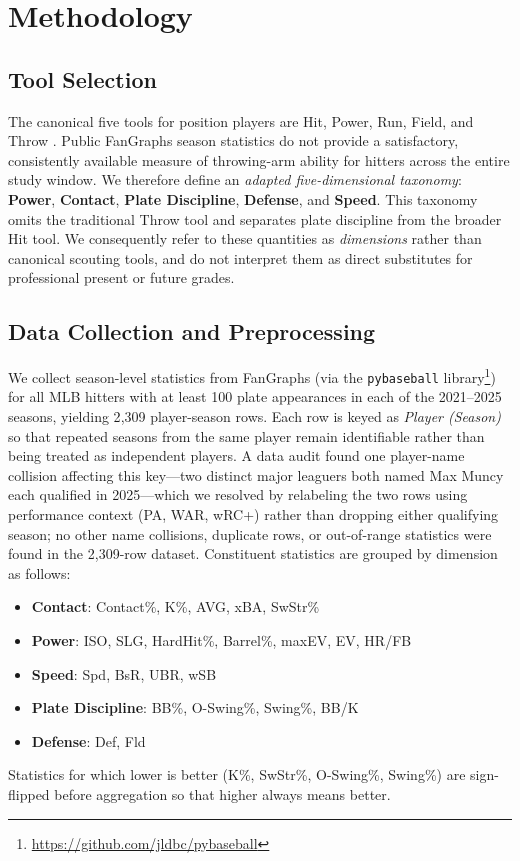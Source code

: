 \documentclass[10pt,twocolumn,letterpaper]{article}
\begin{document}
\section{Methodology}
\label{sec:method}

\subsection{Tool Selection}
The canonical five tools for position players are Hit, Power, Run, Field, and Throw \cite{mcdaniel2014}. Public FanGraphs season statistics do not provide a satisfactory, consistently available measure of throwing-arm ability for hitters across the entire study window. We therefore define an \emph{adapted five-dimensional taxonomy}: \textbf{Power}, \textbf{Contact}, \textbf{Plate Discipline}, \textbf{Defense}, and \textbf{Speed}. This taxonomy omits the traditional Throw tool and separates plate discipline from the broader Hit tool. We consequently refer to these quantities as \emph{dimensions} rather than canonical scouting tools, and do not interpret them as direct substitutes for professional present or future grades.

\subsection{Data Collection and Preprocessing}
\label{sec:data}
We collect season-level statistics from FanGraphs (via the \texttt{pybaseball} library\footnote{\url{https://github.com/jldbc/pybaseball}}) for all MLB hitters with at least 100 plate appearances in each of the 2021--2025 seasons, yielding 2{,}309 player-season rows. Each row is keyed as \emph{Player (Season)} so that repeated seasons from the same player remain identifiable rather than being treated as independent players. A data audit found one player-name collision affecting this key---two distinct major leaguers both named Max Muncy each qualified in 2025---which we resolved by relabeling the two rows using performance context (PA, WAR, wRC+) rather than dropping either qualifying season; no other name collisions, duplicate rows, or out-of-range statistics were found in the 2{,}309-row dataset. Constituent statistics are grouped by dimension as follows:
\begin{itemize}
  \item \textbf{Contact}: Contact\%, K\%, AVG, xBA, SwStr\%
  \item \textbf{Power}: ISO, SLG, HardHit\%, Barrel\%, maxEV, EV, HR/FB
  \item \textbf{Speed}: Spd, BsR, UBR, wSB
  \item \textbf{Plate Discipline}: BB\%, O-Swing\%, Swing\%, BB/K
  \item \textbf{Defense}: Def, Fld
\end{itemize}
Statistics for which lower is better (K\%, SwStr\%, O-Swing\%, Swing\%) are sign-flipped before aggregation so that higher always means better.
\end{document}
